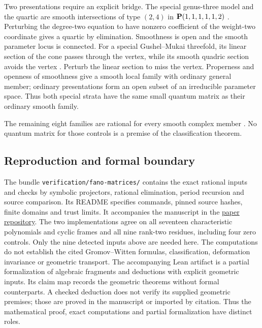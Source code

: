 Two presentations require an explicit bridge. The special genus-three model
and the quartic are smooth intersections of type $(2,4)$ in
$\mathbf P(1,1,1,1,1,2)$ \cite[Section~9]{CCGK}. Perturbing the degree-two equation
to have nonzero coefficient of the weight-two coordinate gives a quartic
by elimination. Smoothness is open and the smooth parameter locus is
connected. For a special Gushel--Mukai threefold, its linear section of the
cone passes through the vertex, while its smooth quadric section avoids the
vertex \cite[Sections~2--3]{DebarreGM}. Perturb the linear section to miss
the vertex. Properness and openness of smoothness give a smooth local family
with ordinary general member; ordinary presentations form an open subset of
an irreducible parameter space. Thus both special strata have the same
small quantum matrix as their ordinary smooth family.

The remaining eight families are rational for every smooth complex member
\cite[Section~1.1]{KuznetsovProkhorov}. No quantum matrix for those controls
is a premise of the classification theorem.

\subsection{Reproduction and formal boundary}
The bundle \texttt{verification/fano-matrices/} contains the exact rational
inputs and checks by symbolic projectors, rational elimination, period
recursion and source comparison. Its README specifies
commands, pinned source hashes, finite domains and trust limits. It accompanies
the manuscript in the \href{https://github.com/tavisrudd/cubic-stabilization-m1}{paper repository}.
The two implementations agree on all seventeen characteristic polynomials
and cyclic frames and all nine rank-two residues, including four zero
controls. Only the nine detected inputs above are needed here.
The computations do not establish the cited Gromov--Witten formulas,
classification, deformation invariance or geometric transport.
The accompanying Lean artifact is a partial formalization of algebraic
fragments and deductions with explicit geometric inputs. Its claim map
records the geometric theorems without formal counterparts. A checked
deduction does not verify its supplied geometric premises; those are proved
in the manuscript or imported by citation. Thus the mathematical proof,
exact computations and partial formalization have distinct roles.
